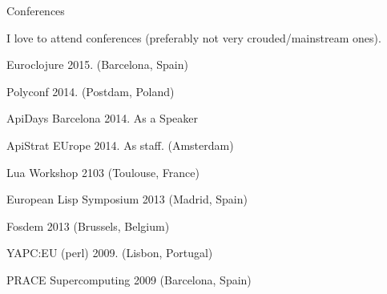 \documentclass{resume} %
\begin{document}
\begin{rSection}{Conferences}

  I love to attend conferences (preferably not very crouded/mainstream ones).

\item Euroclojure 2015. (Barcelona, Spain)
\item Polyconf 2014. (Postdam, Poland)
\item ApiDays Barcelona 2014. As a Speaker
\item ApiStrat EUrope 2014. As staff. (Amsterdam)
\item Lua Workshop 2103 (Toulouse, France)
\item European Lisp Symposium 2013 (Madrid, Spain)
\item Fosdem 2013 (Brussels, Belgium)
\item YAPC:EU (perl) 2009. (Lisbon, Portugal)
\item PRACE Supercomputing 2009 (Barcelona, Spain)

\end{rSection}
\end{document}

